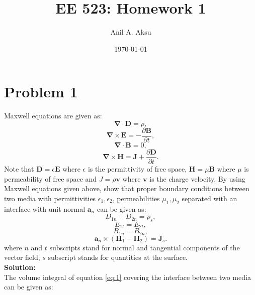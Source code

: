 \documentclass[11pt]{amsart}
\title{EE 523: Homework 1}
\author{Anil A. Aksu}
\date{\today}
\begin{document}
\maketitle

\section*{Problem 1 }

Maxwell equations are given as\cite{Cheng}: 
\begin{equation}
\label{eq:1}
\mathbf{\nabla}\cdot \mathbf{D}=\rho,
\end{equation}
\begin{equation}
\label{eq:2}
\mathbf{\nabla}\times \mathbf{E}=-\frac{\partial \mathbf{B}}{\partial t},
\end{equation}
\begin{equation}
\label{eq:3}
\mathbf{\nabla}\cdot \mathbf{B}=0,
\end{equation}
\begin{equation}
\label{eq:4}
 \mathbf{\nabla}\times \mathbf{H}=\mathbf{J}+\frac{\partial \mathbf{D}}{\partial t}.
\end{equation}
Note that $\mathbf{D}= \epsilon \mathbf{E}$ where $\epsilon$ is the permittivity of free space, $\mathbf{H}=\mu \mathbf{B}$ where $\mu$ is permeability of free space and $J=\rho \mathbf{v}$ where $\mathbf{v}$ is the charge velocity. By using Maxwell equations given above, show that proper boundary conditions between two media with permittivities  $\epsilon_1,\epsilon_2$, permeabilities $\mu_1,\mu_2$ separated with an interface with unit normal $\mathbf{a}_{n}$ can be given as\cite{Cheng,Hesthaven2001}:
\begin{equation*}
D_{1n}-D_{2n}=\rho_s,
\end{equation*}
\begin{equation*}
E_{1t}=E_{2t},
\end{equation*}
\begin{equation*}
B_{1n}=B_{2n},
\end{equation*}
\begin{equation*}
\mathbf{a}_{n}\times(\mathbf{H}_{1}-\mathbf{H}_{2})=\mathbf{J}_s.
\end{equation*}
where $n$ and $t$ subscripts stand for normal and tangential components of the vector field, $s$ subscript stands for quantities at the surface.
\\
\textbf{Solution:}\\
The volume integral of equation \ref{eq:1} covering the interface between two media can be given as:
\end{document}
